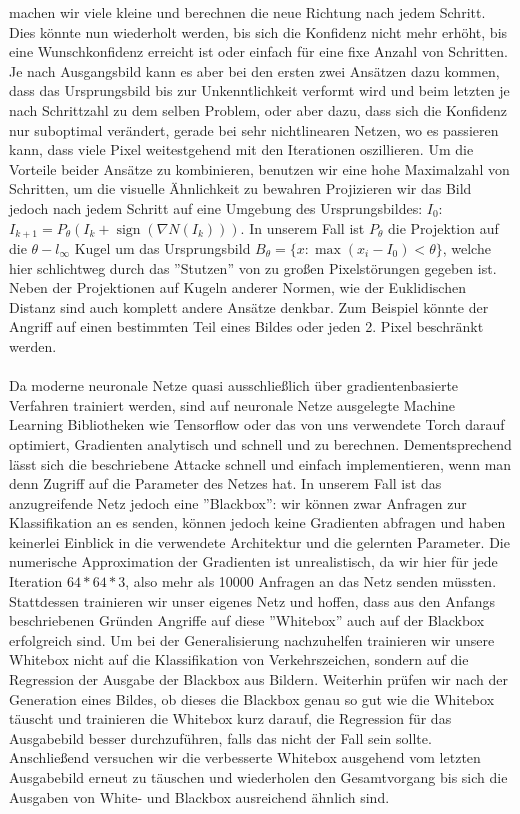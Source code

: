 \documentclass[11pt]{article} %
\newcommand{\sign}{\operatorname{sign}}
\begin{document}
machen wir viele kleine und berechnen die neue Richtung nach jedem Schritt. Dies könnte nun wiederholt werden, bis sich die Konfidenz nicht mehr erhöht, bis eine Wunschkonfidenz erreicht ist oder einfach für eine fixe Anzahl von Schritten. Je nach Ausgangsbild kann es aber bei den ersten zwei Ansätzen dazu kommen, dass das Ursprungsbild bis zur Unkenntlichkeit verformt wird und beim letzten je nach Schrittzahl zu dem selben Problem, oder aber dazu, dass sich die Konfidenz nur suboptimal verändert, gerade bei sehr nichtlinearen Netzen, wo es passieren kann, dass viele Pixel weitestgehend mit den Iterationen oszillieren. Um die Vorteile beider Ansätze zu kombinieren, benutzen wir eine hohe Maximalzahl von Schritten, um die visuelle Ähnlichkeit zu bewahren Projizieren wir das Bild jedoch nach jedem Schritt auf eine Umgebung des Ursprungsbildes: $I_{0}$: $I_{k+1}=P_{\theta}(I_{k}+\sign(\nabla N(I_{k})))$. In unserem Fall ist $P_{\theta}$ die Projektion auf die $\theta-l_{\infty}$ Kugel um das Ursprungsbild $B_{\theta}=\{ x : \max(x_{i}-I_{0})<\theta \}$, welche hier schlichtweg durch das ''Stutzen'' von zu großen Pixelstörungen gegeben ist. Neben der Projektionen auf Kugeln anderer Normen, wie der Euklidischen Distanz sind auch komplett andere Ansätze denkbar. Zum Beispiel könnte der Angriff auf einen bestimmten Teil eines Bildes oder jeden 2. Pixel beschränkt werden. \\ \\
Da moderne neuronale Netze quasi ausschließlich über gradientenbasierte Verfahren trainiert werden, sind auf neuronale Netze ausgelegte Machine Learning Bibliotheken wie Tensorflow oder das von uns verwendete Torch darauf optimiert, Gradienten analytisch und schnell und zu berechnen. Dementsprechend lässt sich die beschriebene Attacke schnell und einfach implementieren, wenn man denn Zugriff auf die Parameter des Netzes hat. In unserem Fall ist das anzugreifende Netz jedoch eine ''Blackbox'': wir können zwar Anfragen zur Klassifikation an es senden, können jedoch keine Gradienten abfragen und haben keinerlei Einblick in die verwendete Architektur und die gelernten Parameter. Die numerische Approximation der Gradienten ist unrealistisch, da wir hier für jede Iteration $64*64*3$, also mehr als 10000 Anfragen an das Netz senden müssten. Stattdessen trainieren wir unser eigenes Netz und hoffen, dass aus den Anfangs beschriebenen Gründen Angriffe auf diese ''Whitebox'' auch auf der Blackbox erfolgreich sind. Um bei der Generalisierung nachzuhelfen trainieren wir unsere Whitebox nicht auf die Klassifikation von Verkehrszeichen, sondern auf die Regression der Ausgabe der Blackbox aus Bildern. Weiterhin prüfen wir nach der Generation eines Bildes, ob dieses die Blackbox genau so gut wie die Whitebox täuscht und trainieren die Whitebox kurz darauf, die Regression für das Ausgabebild besser durchzuführen, falls das nicht der Fall sein sollte. Anschließend versuchen wir die verbesserte Whitebox ausgehend vom letzten Ausgabebild erneut zu täuschen und wiederholen den Gesamtvorgang bis sich die Ausgaben von White- und Blackbox ausreichend ähnlich sind.   
 
\end{document}
